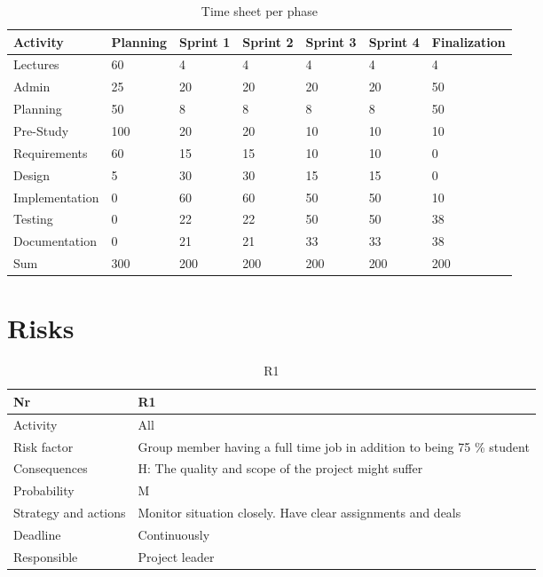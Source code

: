 \documentclass[11pt]{book}
\begin{document}
\begin{table}[H]
\centering
\begin{tabular}{ l | l l l l l l }

Activity & Planning & Sprint 1 & Sprint 2 & Sprint 3 & Sprint 4 & Finalization\\
\hline
Lectures & 60 & 4 & 4 & 4 & 4 & 4\\
\hline
Admin & 25 & 20 & 20 & 20 & 20 & 50\\
\hline
Planning & 50 & 8 & 8 & 8 & 8 & 50\\
\hline
Pre-Study & 100 & 20 & 20 & 10 & 10 & 10\\
\hline
Requirements & 60 & 15 & 15 & 10 & 10 & 0\\
\hline
Design & 5 & 30 & 30 & 15 & 15 & 0\\
\hline
Implementation & 0 & 60 & 60 & 50 & 50 & 10\\
\hline
Testing & 0 & 22 & 22 & 50 & 50 & 38\\
\hline
Documentation & 0 & 21 & 21 & 33 & 33 & 38\\
\hline
Sum & 300 & 200 & 200 & 200 & 200 & 200
\end{tabular}
\label{tab:plan_time_per_phase}
\caption{Time sheet per phase}
\end{table}

\section{Risks}\label{sec:risk_assessment}

\begin{table}[H]
\centering
\begin{tabular}{ l  p{11cm} }
Nr & R1\\
\hline
Activity & All\\
\hline
Risk factor & Group member having a full time job in addition to being 75 \% student\\
\hline
Consequences & H: The quality and scope of the project might suffer\\
\hline
Probability & M\\
\hline
Strategy and actions & Monitor situation closely. Have clear assignments and deals\\
\hline
Deadline & Continuously\\
\hline
Responsible & Project leader\\

\end{tabular}
\label{tab:risk_1}
\caption{R1}
\end{table}
\end{document}
